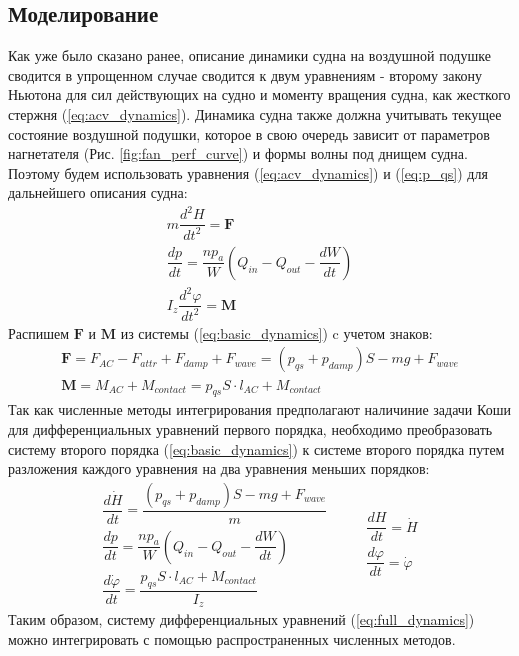 \begin{centering}
    \subsection{Моделирование}
\end{centering}

Как уже было сказано ранее, описание динамики судна на воздушной подушке сводится в упрощенном случае сводится к двум уравнениям - второму закону Ньютона для сил действующих на судно и моменту вращения судна, как жесткого стержня (\ref{eq:acv_dynamics}). Динамика судна также должна учитывать текущее состояние воздушной подушки, которое в свою очередь зависит от параметров нагнетателя (Рис. \ref{fig:fan_perf_curve}) и формы волны под днищем судна. Поэтому будем использовать уравнения (\ref{eq:acv_dynamics}) и (\ref{eq:p_qs}) для дальнейшего описания судна:
\begin{equation}\label{eq:basic_dynamics}
    \begin{gathered}
        m\dfrac{d^2H}{dt^2}=\mathbf{F}\\
        \dfrac{dp}{dt} = \dfrac{np_a}{W} \left( Q_{in} - Q_{out} - \dfrac{dW}{dt}\right)\\
        I_z\dfrac{d^2\varphi}{dt^2}=\mathbf{M}
    \end{gathered}
\end{equation}
Распишем $\mathbf{F}$ и $\mathbf{M}$ из системы (\ref{eq:basic_dynamics}) c учетом знаков:
\begin{equation}
    \begin{gathered}
        \mathbf{F} = F_{AC} - F_{attr} + F_{damp} + F_{wave} = (p_{qs} + p_{damp})S - mg + F_{wave}\\
        \mathbf{M} = M_{AC} + M_{contact} = p_{qs}S \cdot l_{AC} + M_{contact}
    \end{gathered}
\end{equation}
Так как численные методы интегрирования предполагают наличиние задачи Коши для дифференциальных уравнений первого порядка, необходимо преобразовать систему второго порядка (\ref{eq:basic_dynamics}) к системе второго порядка путем разложения каждого уравнения на два уравнения меньших порядков:
\begin{equation}\label{eq:full_dynamics}
    \begin{gathered}
        \dfrac{d\dot{H}}{dt}=\dfrac{(p_{qs} + p_{damp})S - mg + F_{wave}}{m}\\
        \dfrac{dp}{dt} = \dfrac{np_a}{W} \left( Q_{in} - Q_{out} - \dfrac{dW}{dt}\right)\\
        \dfrac{d\dot{\varphi}}{dt} = \dfrac{p_{qs}S \cdot l_{AC} + M_{contact}}{I_z}
    \end{gathered}
    \qquad
    \begin{gathered}
        \dfrac{dH}{dt} = \dot{H}\\
        \dfrac{d\varphi}{dt}=\dot{\varphi}
    \end{gathered}
\end{equation}
Таким образом, систему дифференциальных уравнений (\ref{eq:full_dynamics}) можно интегрировать с помощью распространенных численных методов.

